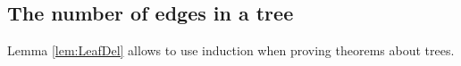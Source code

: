 \subsection{The number of edges in a tree}
Lemma \ref{lem:LeafDel} allows to use induction when proving theorems about trees.
